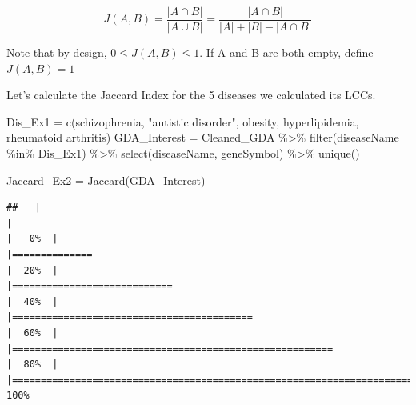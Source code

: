 \documentclass[
]{book}
\newenvironment{Shaded}{\begin{snugshade}}{\end{snugshade}}
\newcommand{\FunctionTok}[1]{\textcolor[rgb]{0.00,0.00,0.00}{#1}}
\newcommand{\NormalTok}[1]{#1}
\newcommand{\OtherTok}[1]{\textcolor[rgb]{0.56,0.35,0.01}{#1}}
\newcommand{\SpecialCharTok}[1]{\textcolor[rgb]{0.00,0.00,0.00}{#1}}
\newcommand{\StringTok}[1]{\textcolor[rgb]{0.31,0.60,0.02}{#1}}
\begin{document}
\[
J(A,B) = \frac{|A \cap B|}{|A \cup B|} = \frac{|A \cap B|}{|A| + |B| - |A \cap B|}
\]

Note that by design, \(0 \leq J(A,B) \leq 1\). If A and B are both empty, define \(J(A,B) = 1\)

Let's calculate the Jaccard Index for the 5 diseases we calculated its LCCs.

\begin{Shaded}
\begin{Highlighting}[]
\NormalTok{Dis\_Ex1 }\OtherTok{=} \FunctionTok{c}\NormalTok{(}\StringTok{\textquotesingle{}schizophrenia\textquotesingle{}}\NormalTok{,}
            \StringTok{"autistic disorder"}\NormalTok{, }
            \StringTok{\textquotesingle{}obesity\textquotesingle{}}\NormalTok{,}
            \StringTok{\textquotesingle{}hyperlipidemia\textquotesingle{}}\NormalTok{,}
            \StringTok{\textquotesingle{}rheumatoid arthritis\textquotesingle{}}\NormalTok{)}
\NormalTok{GDA\_Interest }\OtherTok{=}\NormalTok{ Cleaned\_GDA }\SpecialCharTok{\%\textgreater{}\%} 
  \FunctionTok{filter}\NormalTok{(diseaseName }\SpecialCharTok{\%in\%}\NormalTok{ Dis\_Ex1) }\SpecialCharTok{\%\textgreater{}\%}
  \FunctionTok{select}\NormalTok{(diseaseName, geneSymbol) }\SpecialCharTok{\%\textgreater{}\%}
  \FunctionTok{unique}\NormalTok{()}

\NormalTok{Jaccard\_Ex2 }\OtherTok{=} \FunctionTok{Jaccard}\NormalTok{(GDA\_Interest)}
\end{Highlighting}
\end{Shaded}

\begin{verbatim}
##   |                                                                              |                                                                      |   0%  |                                                                              |==============                                                        |  20%  |                                                                              |============================                                          |  40%  |                                                                              |==========================================                            |  60%  |                                                                              |========================================================              |  80%  |                                                                              |======================================================================| 100%
\end{verbatim}
\end{document}
